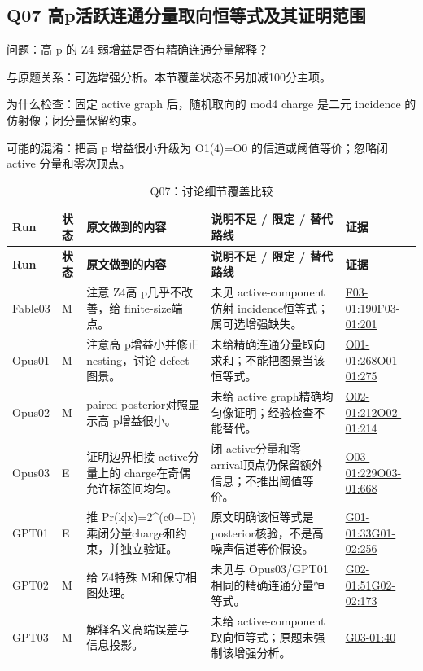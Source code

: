 \documentclass[11pt,a4paper]{article}
\begin{document}
\clearpage
\subsection{Q07 高p活跃连通分量取向恒等式及其证明范围}
\label{aspect:Q07}
问题：高 p 的 Z4 弱增益是否有精确连通分量解释？

与原题关系：可选增强分析。本节覆盖状态不另加减100分主项。

为什么检查：固定 active graph 后，随机取向的 mod4 charge 是二元 incidence 的仿射像；闭分量保留约束。

可能的混淆：把高 p 增益很小升级为 O1(4)=O0 的信道或阈值等价；忽略闭 active 分量和零次顶点。

{\fontsize{9.0}{12.6}\selectfont
\setlength{\tabcolsep}{2.5pt}
\begin{longtable}{>{\raggedright\arraybackslash}p{}>{\raggedright\arraybackslash}p{}>{\raggedright\arraybackslash}p{}>{\raggedright\arraybackslash}p{}>{\raggedright\arraybackslash}p{}}
\caption{Q07：讨论细节覆盖比较}\\
\toprule
\textbf{Run} & \textbf{状态} & \textbf{原文做到的内容} & \textbf{说明不足 / 限定 / 替代路线} & \textbf{证据}\tabularnewline
\midrule
\endfirsthead
\toprule
\textbf{Run} & \textbf{状态} & \textbf{原文做到的内容} & \textbf{说明不足 / 限定 / 替代路线} & \textbf{证据}\tabularnewline
\midrule
\endhead
{}Fable03 & M & 注意 Z4高 p几乎不改善，给 finite-size端点。 & 未见 active-component仿射 incidence恒等式；属可选增强缺失。 & \hyperref[src:F03-01]{F03-01:190}\newline \hyperref[src:F03-01]{F03-01:201}\tabularnewline
{}Opus01 & M & 注意高 p增益小并修正 nesting，讨论 defect图景。 & 未给精确连通分量取向求和；不能把图景当该恒等式。 & \hyperref[src:O01-01]{O01-01:268}\newline \hyperref[src:O01-01]{O01-01:275}\tabularnewline
{}Opus02 & M & paired posterior对照显示高 p增益很小。 & 未给 active graph精确均匀像证明；经验检查不能替代。 & \hyperref[src:O02-01]{O02-01:212}\newline \hyperref[src:O02-01]{O02-01:214}\tabularnewline
{}Opus03 & E & 证明边界相接 active分量上的 charge在奇偶允许标签间均匀。 & 闭 active分量和零 arrival顶点仍保留额外信息；不推出阈值等价。 & \hyperref[src:O03-01]{O03-01:229}\newline \hyperref[src:O03-01]{O03-01:668}\tabularnewline
{}GPT01 & E & 推 Pr(k|x)=2\textasciicircum{}(c0\ensuremath{-}D)乘闭分量charge和约束，并独立验证。 & 原文明确该恒等式是 posterior核验，不是高噪声信道等价假设。 & \hyperref[src:G01-01]{G01-01:33}\newline \hyperref[src:G01-02]{G01-02:256}\tabularnewline
{}GPT02 & M & 给 Z4特殊 M和保守相图处理。 & 未见与 Opus03/GPT01相同的精确连通分量恒等式。 & \hyperref[src:G02-01]{G02-01:51}\newline \hyperref[src:G02-02]{G02-02:173}\tabularnewline
{}GPT03 & M & 解释名义高端误差与信息投影。 & 未给 active-component取向恒等式；原题未强制该增强分析。 & \hyperref[src:G03-01]{G03-01:40}\tabularnewline
\bottomrule
\end{longtable}
}
\end{document}
